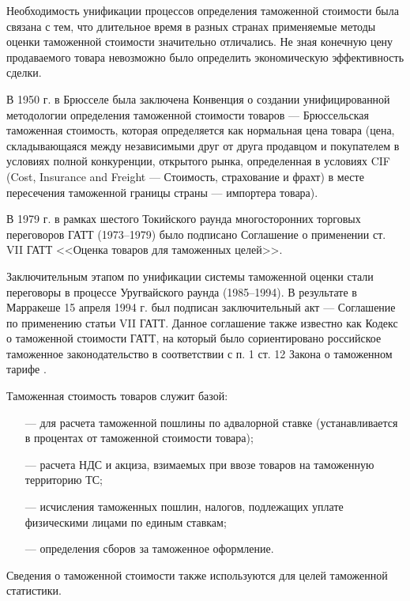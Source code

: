 Необходимость унификации процессов определения таможенной стоимости была связана с тем, что длительное время в разных странах применяемые методы оценки таможенной стоимости значительно отличались. Не зная конечную цену продаваемого товара невозможно было определить экономическую эффективность сделки.

В 1950 г. в Брюсселе была заключена Конвенция о создании унифицированной методологии определения таможенной стоимости товаров  --- Брюссельская таможенная стоимость, которая определяется как нормальная цена товара (цена, складывающаяся между независимыми друг от друга продавцом и покупателем в условиях полной конкуренции, открытого рынка, определенная в условиях CIF (Cost, Insurance and Freight --- Стоимость, страхование и фрахт) в месте пересечения таможенной границы страны --- импортера товара).

В 1979 г. в рамках шестого Токийского раунда многосторонних торговых переговоров ГАТТ (1973--1979) было подписано Соглашение о применении ст. VII ГАТТ <<Оценка товаров для таможенных целей>>.

Заключительным этапом по унификации системы таможенной оценки стали переговоры в процессе Уругвайского раунда (1985--1994). В результате в Марракеше 15 апреля 1994 г. был подписан заключительный акт --- Соглашение по применению статьи VII ГАТТ. Данное соглашение также известно как Кодекс о таможенной стоимости ГАТТ, на который было сориентировано российское таможенное законодательство в соответствии с п. 1 ст. 12 Закона о таможенном тарифе \cites[с. 251]{mahovikova}[с. 125]{novikova}.


Таможенная стоимость товаров служит базой:
\begin{enumerate}
	\item [---] для расчета таможенной пошлины по адвалорной ставке (устанавливается в процентах от таможенной стоимости товара);
	\item [---] расчета НДС и акциза, взимаемых при ввозе товаров на таможенную территорию ТС;
	\item [---] исчисления таможенных пошлин, налогов, подлежащих уплате физическими лицами по единым ставкам;
	\item [---] определения сборов за таможенное оформление.
\end{enumerate}

Сведения о таможенной стоимости также используются для целей таможенной статистики.


















